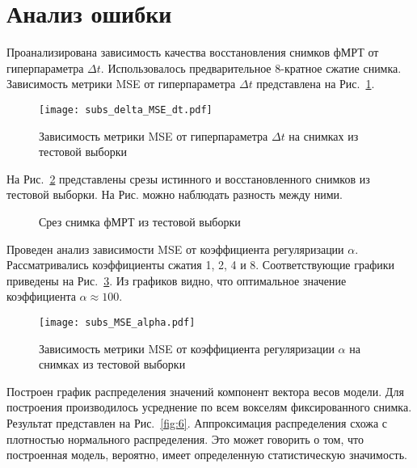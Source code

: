 \documentclass[a4paper, 12pt]{article}
\begin{document}
\section{Анализ ошибки}

	Проанализирована зависимость качества восстановления снимков фМРТ от гиперпараметра $\Delta t$.
	Использовалось предварительное 8-кратное сжатие снимка.
	Зависимость метрики MSE от гиперпараметра $\Delta t$ представлена на Рис.~\ref{fig:3}.

	\begin{figure}[h!]
		\centering
		\texttt{[image: subs\_delta\_MSE\_dt.pdf]}
		\caption{Зависимость метрики MSE от гиперпараметра $\Delta t$ на снимках из тестовой выборки}
		\label{fig:3}
	\end{figure}

	На Рис.~\ref*{fig:4} представлены срезы истинного и восстановленного снимков из 
	тестовой выборки. На Рис. можно наблюдать разность между ними.

	\begin{figure}[h!]
		\centering
		\hfill
		\hfill
		\caption{Срез снимка фМРТ из тестовой выборки}
		\label{fig:4}
	\end{figure}

	Проведен анализ зависимости MSE от коэффициента регуляризации $\alpha$.
	Рассматривались коэффициенты сжатия 1, 2, 4 и 8. 
	Соответствующие графики приведены на Рис.~\ref{fig:5}.
	Из графиков видно, что оптимальное значение коэффициента $\alpha \approx 100$.

	\begin{figure}[h!]
		\centering
		\texttt{[image: subs\_MSE\_alpha.pdf]}
		\caption{Зависимость метрики MSE от коэффициента регуляризации $\alpha$ на снимках из тестовой выборки}
		\label{fig:5}
	\end{figure}

	Построен график распределения значений компонент вектора весов модели.
	Для построения производилось усреднение по всем вокселям фиксированного снимка.
	Результат представлен на Рис.~\ref{fig:6}.
	Аппроксимация распределения схожа с плотностью нормального распределения.
	Это может говорить о том, что построенная модель, вероятно, имеет определенную
	статистическую значимость.
\end{document}
